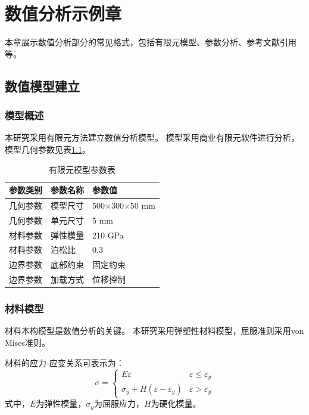 \chapter{数值分析示例章}
\label{chap:analysis}

本章展示数值分析部分的常见格式，包括有限元模型、参数分析、参考文献引用等。

\section{数值模型建立}
\subsection{模型概述}
本研究采用有限元方法建立数值分析模型。
模型采用商业有限元软件进行分析，模型几何参数见表\ref{tab:model_params}。

\begin{table}[htbp]
    \caption{有限元模型参数表}
    \label{tab:model_params}
    \centering
    \begin{tabular}{lll}
        \toprule
        参数类别 & 参数名称 & 参数值 \\
        \midrule
        几何参数 & 模型尺寸 & 500$\times$300$\times$50 mm \\
        几何参数 & 单元尺寸 & 5 mm \\
        材料参数 & 弹性模量 & 210 GPa \\
        材料参数 & 泊松比 & 0.3 \\
        边界参数 & 底部约束 & 固定约束 \\
        边界参数 & 加载方式 & 位移控制 \\
        \bottomrule
    \end{tabular}
\end{table}

\subsection{材料模型}
材料本构模型是数值分析的关键。
本研究采用弹塑性材料模型，屈服准则采用von Mises准则\cite{vonmises1913}。

材料的应力-应变关系可表示为：
\begin{equation}
    \sigma = \begin{cases}
        E\varepsilon & \varepsilon \leq \varepsilon_y \\
        \sigma_y + H(\varepsilon - \varepsilon_y) & \varepsilon > \varepsilon_y
    \end{cases}
    \label{eq:stress_strain}
\end{equation}
式中，$E$为弹性模量，$\sigma_y$为屈服应力，$H$为硬化模量。


